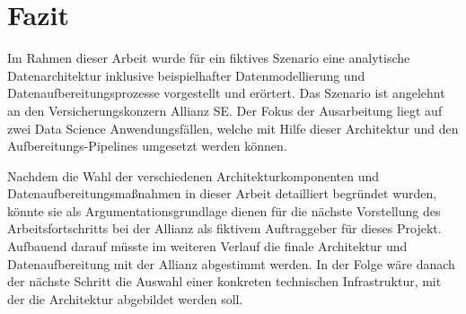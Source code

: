 \chapter{Fazit}
\label{chap:fazit}

Im Rahmen dieser Arbeit wurde für ein fiktives Szenario
eine analytische Datenarchitektur inklusive 
beispielhafter Datenmodellierung und Datenaufbereitungsprozesse
vorgestellt und erörtert.
Das Szenario ist angelehnt an den Versicherungskonzern Allianz SE.
Der Fokus der Ausarbeitung liegt auf zwei
Data Science Anwendungsfällen, welche mit Hilfe
dieser Architektur und den Aufbereitungs-Pipelines umgesetzt werden können. 

Nachdem die Wahl der verschiedenen Architekturkomponenten 
und Datenaufbereitungsmaßnahmen in dieser Arbeit detailliert begründet wurden,
könnte sie als Argumentationsgrundlage dienen 
für die nächste Vorstellung des Arbeitsfortschritts
bei der Allianz als fiktivem Auftraggeber für dieses Projekt.
Aufbauend darauf müsste im weiteren Verlauf
die finale Architektur und Datenaufbereitung mit
der Allianz abgestimmt werden.
In der Folge wäre danach der nächste Schritt
die Auswahl einer konkreten technischen Infrastruktur,
mit der die Architektur abgebildet werden soll.
